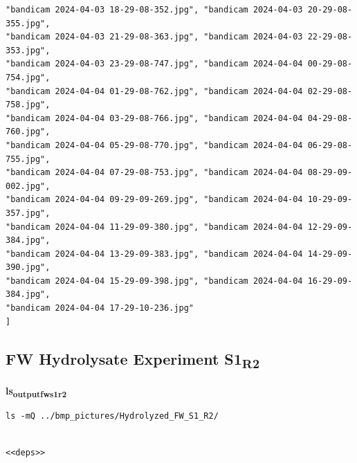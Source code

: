 \documentclass[11pt]{article}
\begin{document}
\begin{verbatim}
"bandicam 2024-04-03 18-29-08-352.jpg", "bandicam 2024-04-03 20-29-08-355.jpg",
"bandicam 2024-04-03 21-29-08-363.jpg", "bandicam 2024-04-03 22-29-08-353.jpg",
"bandicam 2024-04-03 23-29-08-747.jpg", "bandicam 2024-04-04 00-29-08-754.jpg",
"bandicam 2024-04-04 01-29-08-762.jpg", "bandicam 2024-04-04 02-29-08-758.jpg",
"bandicam 2024-04-04 03-29-08-766.jpg", "bandicam 2024-04-04 04-29-08-760.jpg",
"bandicam 2024-04-04 05-29-08-770.jpg", "bandicam 2024-04-04 06-29-08-755.jpg",
"bandicam 2024-04-04 07-29-08-753.jpg", "bandicam 2024-04-04 08-29-09-002.jpg",
"bandicam 2024-04-04 09-29-09-269.jpg", "bandicam 2024-04-04 10-29-09-357.jpg",
"bandicam 2024-04-04 11-29-09-380.jpg", "bandicam 2024-04-04 12-29-09-384.jpg",
"bandicam 2024-04-04 13-29-09-383.jpg", "bandicam 2024-04-04 14-29-09-390.jpg",
"bandicam 2024-04-04 15-29-09-398.jpg", "bandicam 2024-04-04 16-29-09-384.jpg",
"bandicam 2024-04-04 17-29-10-236.jpg"
]
\end{verbatim}

\subsection{FW Hydrolysate Experiment S1\textsubscript{R2}}
\label{sec:org6f62751}
\textbf{ls\textsubscript{output}\textsubscript{fw}\textsubscript{s1}\textsubscript{r2}}
\begin{verbatim}
ls -mQ ../bmp_pictures/Hydrolyzed_FW_S1_R2/
\end{verbatim}

\begin{verbatim}

<<deps>>

\end{verbatim}
\end{document}
